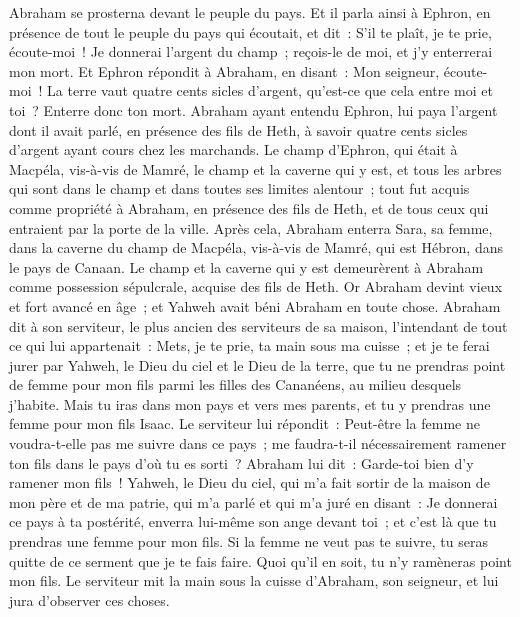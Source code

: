\begin{multicols}{2}
Abraham se prosterna devant le peuple du pays.
Et il parla ainsi à Ephron, en présence de tout le peuple du pays qui écoutait, et dit~: S'il te plaît, je te prie, écoute-moi~! Je donnerai l'argent du champ~; reçois-le de moi, et j'y enterrerai mon mort.
Et Ephron répondit à Abraham, en disant~:
Mon seigneur, écoute-moi~! La terre vaut quatre cents sicles d'argent, qu'est-ce que cela entre moi et toi~? Enterre donc ton mort.
Abraham ayant entendu Ephron, lui paya l'argent dont il avait parlé, en présence des fils de Heth, à savoir quatre cents sicles d'argent ayant cours chez les marchands.
Le champ d'Ephron, qui était à Macpéla, vis-à-vis de Mamré, le champ et la caverne qui y est, et tous les arbres qui sont dans le champ et dans toutes ses limites alentour~;
tout fut acquis comme propriété à Abraham, en présence des fils de Heth, et de tous ceux qui entraient par la porte de la ville.
Après cela, Abraham enterra Sara, sa femme, dans la caverne du champ de Macpéla, vis-à-vis de Mamré, qui est Hébron, dans le pays de Canaan.
Le champ et la caverne qui y est demeurèrent à Abraham comme possession sépulcrale, acquise des fils de Heth.
\VerseOne{}Or Abraham devint vieux et fort avancé en âge~; et Yahweh avait béni Abraham en toute chose.
Abraham dit à son serviteur, le plus ancien des serviteurs de sa maison, l'intendant de tout ce qui lui appartenait~: Mets, je te prie, ta main sous ma cuisse~;
et je te ferai jurer par Yahweh, le Dieu du ciel et le Dieu de la terre, que tu ne prendras point de femme pour mon fils parmi les filles des Cananéens, au milieu desquels j'habite.
Mais tu iras dans mon pays et vers mes parents, et tu y prendras une femme pour mon fils Isaac.
Le serviteur lui répondit~: Peut-être la femme ne voudra-t-elle pas me suivre dans ce pays~; me faudra-t-il nécessairement ramener ton fils dans le pays d'où tu es sorti~?
Abraham lui dit~: Garde-toi bien d'y ramener mon fils~!
Yahweh, le Dieu du ciel, qui m'a fait sortir de la maison de mon père et de ma patrie, qui m'a parlé et qui m'a juré en disant~: Je donnerai ce pays à ta postérité, enverra lui-même son ange devant toi~; et c'est là que tu prendras une femme pour mon fils.
Si la femme ne veut pas te suivre, tu seras quitte de ce serment que je te fais faire. Quoi qu'il en soit, tu n'y ramèneras point mon fils.
Le serviteur mit la main sous la cuisse d'Abraham, son seigneur, et lui jura d'observer ces choses.

\end{multicols}
